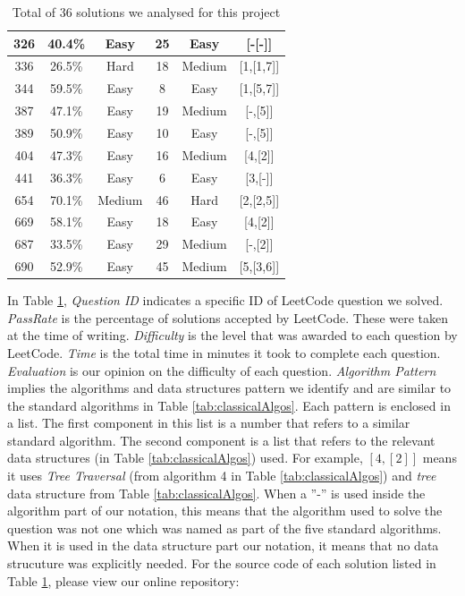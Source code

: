 \documentclass[conference]{IEEEtran}
\begin{document}
\begin{table}
\begin{tabular}{|c| c| c| c| c| c|}
  	\hline
 	326 & 40.4\% &Easy  &25  &Easy&[-[-]]\\
   	\hline
  	336 & 26.5\% &Hard &18  &Medium&[1,[1,7]]\\
  	\hline
 	344 & 59.5\% &Easy  &8  &Easy&[1,[5,7]]\\
  	\hline
 	387 & 47.1\% &Easy  & 19 &Medium&[-,[5]]\\
  	\hline
 	389 & 50.9\% &Easy  & 10 &Easy& [-,[5]]\\
  	\hline
 	404 & 47.3\% &Easy  &16  &Medium&[4,[2]]\\
	\hline
 	441 & 36.3\% &Easy  &6&Easy &[3,[-]]\\ 	
  	\hline
 	654 & 70.1\% &Medium  &46  &Hard&[2,[2,5]]\\
  	\hline
	669 &  58.1\%& Easy &18  &Easy&[4,[2]]\\
  	\hline
	687 &  33.5\%& Easy &29  &Medium&[-,[2]]\\
  	\hline
 	690 &  52.9\%& Easy &   45&Medium&[5,[3,6]]\\[1ex]
 	\hline
\end{tabular}
\caption{Total of 36 solutions we analysed for this project}
\label{tab:tabSols}
\end{table}
\par In Table \ref{tab:tabSols}, \textit{Question ID} indicates a specific ID of LeetCode question we solved. \textit{PassRate} is the percentage of solutions accepted by LeetCode. These were taken at the time of writing. \textit{Difficulty} is the level that was awarded to each question by LeetCode. \textit{Time} is the total time in minutes it took to complete each question. \textit{Evaluation} is our opinion on the difficulty of each question. \textit{Algorithm Pattern} implies the algorithms and data structures pattern we identify and are similar to the standard algorithms in Table \ref{tab:classicalAlgos}. Each pattern is enclosed in a list. The first component in this list is a number that refers to a similar standard algorithm. The second component is a list that refers to the relevant data structures (in Table \ref{tab:classicalAlgos}) used. For example, $[4,[2]]$ means it uses \textit{Tree Traversal} (from algorithm 4 in Table \ref{tab:classicalAlgos}) and \textit{tree} data structure from Table \ref{tab:classicalAlgos}. When a ''-'' is used inside the algorithm part of our notation, this means that the algorithm used to solve the question was not one which was named as part of the five standard algorithms. When it is used in the data structure part our notation, it means that no data strucuture was explicitly needed. For the source code of each solution listed in Table \ref{tab:tabSols}, please view our online repository:
\end{document}
